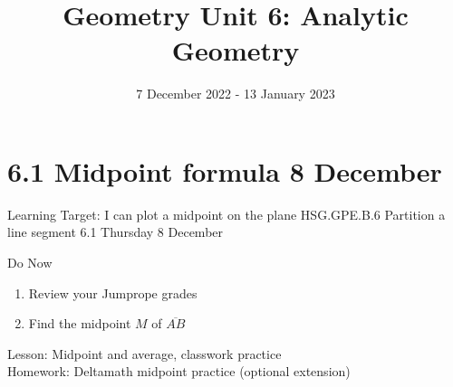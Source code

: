 

\newcommand\ticks{}
  \def\ticks{{Bar[scale=2]}-{Bar[scale=2]}}
\newcommand\paraticks{}
  \def\paraticks{{Straight Barb[reversed, scale=2]}-{Straight Barb[scale=2]}}

\title{Geometry Unit 6: Analytic Geometry}
\date{7 December 2022 - 13 January 2023}


\frame{\titlepage}
\section[Outline]{}
\frame{\tableofcontents}

\section{6.1 Midpoint formula \hfill 8 December \,}
\begin{frame}{Learning Target: I can plot a midpoint on the plane}
  {HSG.GPE.B.6 Partition a line segment \hfill \alert{6.1 Thursday 8 December}}
  \begin{block}{Do Now}
    \begin{enumerate}
      \item Review your Jumprope grades
      \item Find the midpoint $M$ of $\overline{AB}$
    \end{enumerate}
    \begin{center}
    \end{center} 
  \end{block}
    Lesson: Midpoint and average, classwork practice \\
    Homework: Deltamath midpoint practice (optional extension)
\end{frame}

